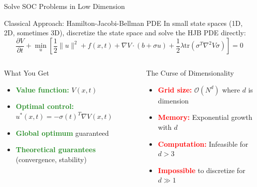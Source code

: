 \documentclass[aspectratio=169,xcolor=dvipsnames]{beamer}
\begin{document}
\begin{frame}{Solve SOC Problems in Low Dimension}
    \vspace{-0.1cm}
    
    \begin{block}{Classical Approach: Hamilton-Jacobi-Bellman PDE}
        In small state spaces (1D, 2D, sometimes 3D), discretize the state space and solve the HJB PDE directly:
        \begin{equation}
        \frac{\partial V}{\partial t} + \min_u \left[ \frac{1}{2}\|u\|^2 + f(x,t) + \nabla V \cdot (b + \sigma u) + \frac{1}{2}\lambda \text{tr}(\sigma^T \nabla^2 V \sigma) \right] = 0
        \end{equation}
    \end{block}

    \vspace{-0.4cm}
    
    \begin{columns}[t]
        \begin{block}{What You Get}
            \begin{itemize}
                \item \textcolor{ForestGreen}{\textbf{Value function:}} $V(x,t)$
                \item \textcolor{ForestGreen}{\textbf{Optimal control:}} $u^*(x,t) = -\sigma(t)^T \nabla V(x,t)$
                \item \textcolor{ForestGreen}{\textbf{Global optimum}} guaranteed
                \item \textcolor{ForestGreen}{\textbf{Theoretical guarantees}} (convergence, stability)
            \end{itemize}
        \end{block}
        
        \begin{alertblock}{The Curse of Dimensionality}
            \begin{itemize}
                \item \textcolor{red}{\textbf{Grid size:}} $\mathcal{O}(N^d)$ where $d$ is dimension
                \item \textcolor{red}{\textbf{Memory:}} Exponential growth with $d$
                \item \textcolor{red}{\textbf{Computation:}} Infeasible for $d > 3$
                \item \textcolor{red}{\textbf{Impossible}} to discretize for $d \gg 1$
            \end{itemize}
        \end{alertblock}
    \end{columns}



\end{frame}
\end{document}
